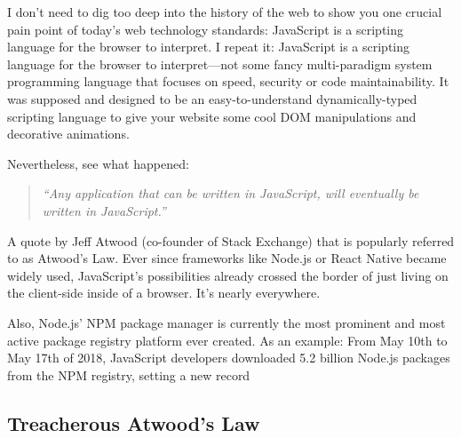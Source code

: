 \documentclass[10pt]{article}
\begin{document}
\begin{sloppypar}
  I don’t need to dig too deep into the history of the web to show you one crucial pain point of today’s web technology standards: JavaScript is a scripting language for the browser to interpret. I repeat it: JavaScript is a scripting language for the browser to interpret—not some fancy multi-paradigm system programming language that focuses on speed, security or code maintainability. It was supposed and designed to be an easy-to-understand dynamically-typed scripting language to give your website some cool DOM manipulations and decorative animations.

  Nevertheless, see what happened:

  \begin{quote}
    \emph{``Any application that can be written in JavaScript, will eventually be written in JavaScript.'' \citep{atwood_principle_2007}}
  \end{quote}

  A quote by Jeff Atwood (co-founder of Stack Exchange) that is popularly referred to as Atwood’s Law. Ever since frameworks like Node.js or React Native became widely used, JavaScript’s possibilities already crossed the border of just living on the client-side inside of a browser. It’s nearly everywhere.

  Also, Node.js’ NPM package manager is currently the most prominent and most active package registry platform ever created. As an example: From May 10th to May 17th of 2018, JavaScript developers downloaded 5.2 billion Node.js packages from the NPM registry, setting a new record \citep{npm_how_2018}

  \begin{figure}[ht]
    \centering
    \label{fig:atwood-law}
  \end{figure}

  \subsection{Treacherous Atwood’s Law}
  \label{sec:atwood-law}


\end{sloppypar}
\end{document}
